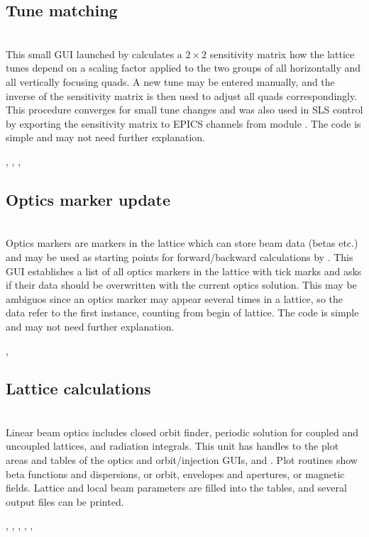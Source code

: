 \documentclass[12pt]{article}
\newcommand\code[1]{{\tt #1}}
\newcommand{\opagui}[1]{\colorbox{blue!20}{{\color{black}\code{#1}}}}
\newcommand{\oguih}[2]{\subsection{\label{#2}#1}{\Huge\opagui{#2}}\\}
\newcommand{\ogui}[1]{\hyperref[#1]{\opagui{#1}}}
\newcommand{\opauni}[1]{\colorbox{orange!30}{{\color{black}\code{#1}}}}
\newcommand{\ounih}[2]{\subsection{\label{#2}#1}{\Huge\opauni{#2}}\\}
\newcommand{\ouni}[1]{\hyperref[#1]{\opauni{#1}}}
\newcommand{\uses}[1]{\flushleft {\bf Uses:} #1}
\newcommand{\desc}[1]{#1}
\begin{document}
\oguih{Tune matching}{otunematrix} 

This small GUI launched by \ogui{opalinop} calculates a $2\times 2$ sensitivity matrix how the lattice tunes depend on a scaling factor applied to the two groups of all horizontally and all vertically focusing quads. A new tune may be entered manually, and the inverse of the sensitivity matrix is then used to adjust all quads correspondingly. This procedure converges for small tune changes and was also used in SLS control by exporting the sensitivity matrix to EPICS channels from module \ogui{opacurrents}. The code is simple and may not need further explanation.

\uses{\ouni{linoplib}, \ouni{globlib}, \ouni{mathlib}, \ouni{../com/asaux}} 


\oguih{Optics marker update}{owriteomrk} 
\desc{Optics markers are markers in the lattice which can store beam data (betas etc.) and may be used as starting points for forward/backward calculations by \ogui{ostartmenu}. This GUI establishes a list of all optics markers in the lattice with tick marks and asks if their data should be overwritten with the current optics solution. This may be ambiguos since an optics marker may appear several times in a lattice, so the data refer to the first instance, counting from begin of lattice. The code is simple and may not need further explanation.}

\uses{\ouni{globlib}, \ouni{../com/asaux}} 




\ounih{Lattice calculations}{linoplib} 

\desc{Linear beam optics includes closed orbit finder, periodic solution for coupled and uncoupled lattices, and radiation integrals. 
This unit has handles to the plot areas and tables of the optics and orbit/injection GUIs, \ogui{opalinop} and \ogui{opaorbit}.
Plot routines show beta functions and dispersions, or orbit, envelopes and apertures, or magnetic fields. Lattice and local beam parameters are filled into the tables, and several output files can be printed. 
}


\uses{
 \ouni{elemlib}, \ogui{opatunediag}, \ouni{globlib}, \ouni{mathlib}, \ouni{../com/vgraph}, \ouni{../com/asaux}}
\end{document}
